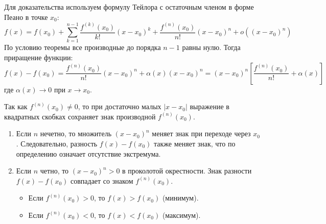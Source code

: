 \begin{tcolorbox}[title=Доказательство, breakable]
Для доказательства используем формулу Тейлора с остаточным членом в форме Пеано в точке $x_0$:
\[ f(x) = f(x_0) + \sum_{k=1}^{n-1} \frac{f^{(k)}(x_0)}{k!}(x - x_0)^k + \frac{f^{(n)}(x_0)}{n!}(x - x_0)^n + o((x - x_0)^n) \]
По условию теоремы все производные до порядка $n-1$ равны нулю. Тогда приращение функции:
\[ f(x) - f(x_0) = \frac{f^{(n)}(x_0)}{n!}(x - x_0)^n + \alpha(x)(x - x_0)^n = (x - x_0)^n \left[ \frac{f^{(n)}(x_0)}{n!} + \alpha(x) \right] \]
где $\alpha(x) \to 0$ при $x \to x_0$. 

Так как $f^{(n)}(x_0) \neq 0$, то при достаточно малых $|x - x_0|$ выражение в квадратных скобках сохраняет знак производной $f^{(n)}(x_0)$.
\begin{enumerate}
    \item Если $n$ нечетно, то множитель $(x - x_0)^n$ меняет знак при переходе через $x_0$. Следовательно, разность $f(x) - f(x_0)$ также меняет знак, что по определению означает отсутствие экстремума.
    \item Если $n$ четно, то $(x - x_0)^n > 0$ в проколотой окрестности. Знак разности $f(x) - f(x_0)$ совпадает со знаком $f^{(n)}(x_0)$.
    \begin{itemize}
        \item Если $f^{(n)}(x_0) > 0$, то $f(x) > f(x_0)$ (минимум).
        \item Если $f^{(n)}(x_0) < 0$, то $f(x) < f(x_0)$ (максимум).
    \end{itemize}
\end{enumerate}
\end{tcolorbox}